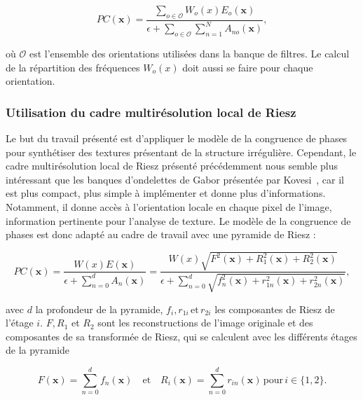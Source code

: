 \begin{equation}
    PC(\mathbf{x}) = \frac{\sum_{o\in \mathcal{O}} W_o(x)E_o(\mathbf{x})}{\epsilon + \sum_{o \in \mathcal{O}}\sum_{n=1}^{N} A_{no}(\mathbf{x})},
\end{equation}

\noindent où $\mathcal{O}$ est l'ensemble des orientations utilisées dans la banque de filtres. Le calcul de la répartition des fréquences $W_o(x)$ doit aussi se faire pour chaque orientation.

\subsubsection{Utilisation du cadre multirésolution local de Riesz}

Le but du travail présenté est d'appliquer le modèle de la congruence de phases pour synthétiser des textures présentant de la structure irrégulière. Cependant, le cadre multirésolution local de Riesz présenté précédemment nous semble plus intéressant que les banques d'ondelettes de Gabor présentée par Kovesi~\cite{kovesi_image_1995}, car il est plus compact, plus simple à implémenter et donne plus d'informations. Notamment, il donne accès à l'orientation locale en chaque pixel de l'image, information pertinente pour l'analyse de texture. Le modèle de la congruence de phases est donc adapté au cadre de travail avec une pyramide de Riesz :

\begin{equation}
    PC(\mathbf{x}) = \frac{W(x)E(\mathbf{x})}{\epsilon + \sum_{n=0}^{d} A_{n}(\mathbf{x})} = \frac{W(x)\sqrt{F^2(\mathbf{x})+R_1^2(\mathbf{x})+R_2^2(\mathbf{x})}}{\epsilon + \sum_{n=0}^{d} \sqrt{f_n^2(\mathbf{x}) + r_{1n}^2(\mathbf{x}) + r_{2n}^2(\mathbf{x})}},
\end{equation}

\noindent avec $d$ la profondeur de la pyramide, $f_i, r_{1i}\, \text{et}\, r_{2i}$ les composantes de Riesz de l'étage $i$. $F, R_1$ et $R_2$ sont les reconstructions de l'image originale et des composantes de sa transformée de Riesz, qui se calculent avec les différents étages de la pyramide

\begin{equation}
    F(\mathbf{x}) = \sum_{n=0}^{d} f_n(\mathbf{x}) \quad \text{et} \quad R_i(\mathbf{x}) = \sum_{n=0}^{d} r_{in}(\mathbf{x})\, \text{pour}\, i \in \{1, 2\}.
\end{equation}

